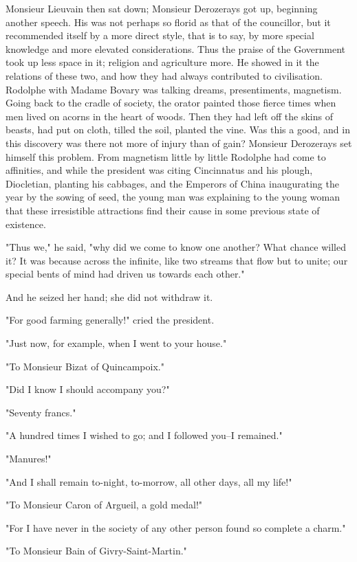 \documentclass{tufte-book}
\begin{document}
Monsieur Lieuvain then sat down; Monsieur Derozerays got up, beginning
another speech. His was not perhaps so florid as that of the councillor,
but it recommended itself by a more direct style, that is to say, by
more special knowledge and more elevated considerations. Thus the praise
of the Government took up less space in it; religion and agriculture
more. He showed in it the relations of these two, and how they had
always contributed to civilisation. Rodolphe with Madame Bovary was
talking dreams, presentiments, magnetism. Going back to the cradle of
society, the orator painted those fierce times when men lived on acorns
in the heart of woods. Then they had left off the skins of beasts, had
put on cloth, tilled the soil, planted the vine. Was this a good, and
in this discovery was there not more of injury than of gain? Monsieur
Derozerays set himself this problem. From magnetism little by little
Rodolphe had come to affinities, and while the president was citing
Cincinnatus and his plough, Diocletian, planting his cabbages, and the
Emperors of China inaugurating the year by the sowing of seed, the
young man was explaining to the young woman that these irresistible
attractions find their cause in some previous state of existence.

"Thus we," he said, "why did we come to know one another? What chance
willed it? It was because across the infinite, like two streams that
flow but to unite; our special bents of mind had driven us towards each
other."

And he seized her hand; she did not withdraw it.

"For good farming generally!" cried the president.

"Just now, for example, when I went to your house."

"To Monsieur Bizat of Quincampoix."

"Did I know I should accompany you?"

"Seventy francs."

"A hundred times I wished to go; and I followed you--I remained."

"Manures!"

"And I shall remain to-night, to-morrow, all other days, all my life!"

"To Monsieur Caron of Argueil, a gold medal!"

"For I have never in the society of any other person found so complete a
charm."

"To Monsieur Bain of Givry-Saint-Martin."
\end{document}
